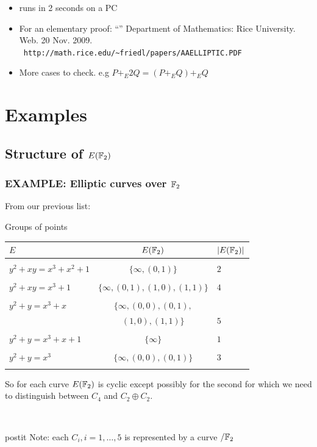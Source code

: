 \documentclass[10pt,handout]{beamer} %
\begin{document}
\begin{frame}
\begin{scriptsize}
\begin{itemize}[<+-| alert@+>]
 \item runs in 2 seconds on a PC
 \item For an elementary proof:
 ``''
Department of Mathematics: Rice
University. Web. 20 Nov. 2009.\\ \ \hfill\texttt{http://math.rice.edu/\~{}friedl/papers/AAELLIPTIC.PDF}
\item More cases to check. e.g  \alert{$P+_E2Q=(P+_EQ)+_EQ$}
\end{itemize}
\end{scriptsize}
\end{frame}



\section{Examples}
\subsection{Structure of \texorpdfstring{$E(\mathbb F_2)$}{E(F2)}}
\begin{frame}
\frametitle{EXAMPLE: Elliptic curves over $\mathbb F_2$}

From our previous list:
\begin{block}{Groups of points}
\begin{tabular}{|l|c|l|}
\hline
 $E$ & $E(\mathbb F_2)$ & $|E(\mathbb F_2)|$\\
\hline
&&\\
 $y^2+xy=x^3+x^2+1$ & $\{\infty,(0,1)\}$& $2$\\
&&\\
$y^2+xy=x^3+1$ & $\{\infty,(0,1),(1,0),(1,1)\}$ & $4$\\
&&\\
$y^2+y=x^3+x$&$\{\infty,(0,0),(0,1),$ &\\ &$(1,0),(1,1)\}$&$5$\\
&&\\
 $y^2+y=x^3+x+1$ &$\{\infty\}$&$1$\\
&&\\
$y^2+y=x^3$ & $\{\infty,(0,0), (0,1)\}$ & $3$ \\
&&\\\hline
\end{tabular}
\end{block}
\pause
So for each curve $E(\mathbb F_2)$ is cyclic except possibly for the second for which we need to distinguish between
$C_4$ and $C_2\oplus C_2$.\pause

\ \hfill \begin{beamercolorbox}[center,wd=9cm]{postit}
Note: each $C_i, i=1,\ldots,5$ is represented by a curve $/\mathbb F_2$
            \end{beamercolorbox}
\end{frame}
\end{document}

